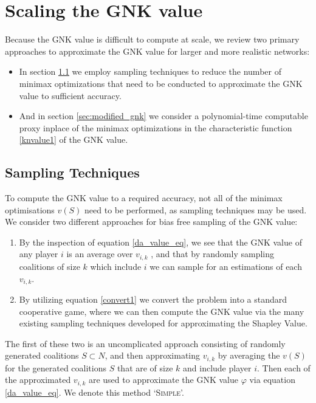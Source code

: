 \section{Scaling the GNK value}\label{sec:scaling}

Because the GNK value is difficult to compute at scale, we review two primary approaches to approximate the GNK value for larger and more realistic networks:

\begin{itemize}
    \item In section \ref{sec:sampling_techniques} we employ sampling techniques to reduce the number of minimax optimizations that need to be conducted to approximate the GNK value to sufficient accuracy.
    \item And in section \ref{sec:modified_gnk} we consider a polynomial-time computable proxy inplace of the minimax optimizations in the characteristic function \eqref{knvalue1} of the GNK value.
\end{itemize}

\subsection{Sampling Techniques}\label{sec:sampling_techniques}
To compute the GNK value to a required accuracy, not all of the minimax optimisations $v(S)$ need to be performed, as sampling techniques may be used.
We consider two different approaches for bias free sampling of the GNK value:
\begin{enumerate}
    \item By the inspection of equation \ref{da_value_eq}, we see that the GNK value of any player $i$ is an average over $v_{i,k}$%
, and that by randomly sampling coalitions of size $k$ which include $i$ we can sample for an estimations of each $v_{i,k}$.
    \item By utilizing equation \ref{convert1} we convert the problem into a standard cooperative game, where we can then compute the GNK value via the many existing sampling techniques developed for approximating the Shapley Value.
\end{enumerate}

The first of these two is an uncomplicated approach consisting of randomly generated coalitions $S\subset N$, %
and then approximating $v_{i,k}$ by averaging the $v(S)$ for the generated coalitions $S$ that are of size $k$ and include player $i$.
Then each of the approximated $v_{i,k}$ are used to approximate the GNK value $\varphi$ via equation \ref{da_value_eq}. We denote this method `\textsc{Simple}'.

